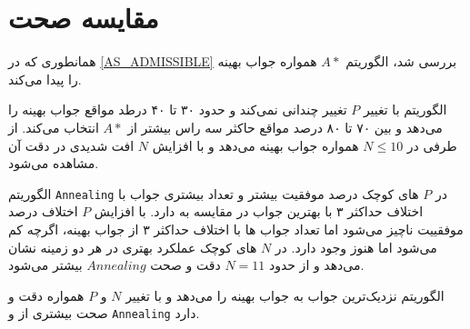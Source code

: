 \section{مقایسه صحت}
همانطوری که در
\cref{AS_ADMISSIBLE}
بررسی شد، الگوریتم
$A*$
همواره جواب بهینه را پیدا می‌کند.

الگوریتم
با تغییر
$P$
تغییر چندانی نمی‌کند و حدود ۳۰ تا ۴۰ درطد مواقع جواب بهینه را می‌دهد و بین ۷۰ تا ۸۰ درصد مواقع حاکثر سه راس بیشتر از 
$A*$
انتخاب می‌کند. از طرفی در 
$N\leq10$
همواره جواب بهینه می‌دهد و  با افزایش 
$N$
افت شدیدی در دقت آن مشاهده می‌شود.

الگوریتم
\verb;Annealing;
در 
$P$
های کوچک  درصد موفقیت بیشتر   و تعداد بیشتری جواب با اختلاف حداکثر ۳ با  بهترین جواب 
در مقایسه به
دارد.
با افزایش 
$P$
اختلاف درصد موفقییت ناچیز می‌شود اما تعداد جواب ها با اختلاف حداکثر ۳ از جواب بهینه، اگرچه کم می‌شود اما هنوز وجود دارد.
در 
$N$
های کوچک 
عملکرد بهتری در هر دو زمینه نشان می‌دهد و از حدود
$N=11$
دقت و صحت
$Annealing$
بیشتر می‌شود.

الگوریتم
نزدیک‌ترین جواب به جواب بهینه را می‌دهد و با تغییر
$N$
و
$P$
همواره دقت و صحت بیشتری از
و
\verb;Annealing;
دارد.





